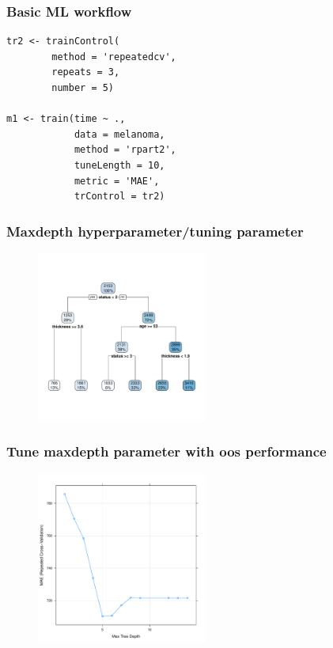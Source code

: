 \documentclass[handout, aspectratio = 169]{beamer}
\begin{document}
\begin{frame}[fragile]
\frametitle{Basic ML workflow}
\begin{Verbatim}
tr2 <- trainControl(
        method = 'repeatedcv',
        repeats = 3,
        number = 5)

m1 <- train(time ~ ., 
            data = melanoma,
            method = 'rpart2',
            tuneLength = 10,
            metric = 'MAE',
            trControl = tr2)

\end{Verbatim}

\end{frame} 




\begin{frame}
\frametitle{Maxdepth hyperparameter/tuning parameter}
\vspace{-4mm}
\begin{figure}
    \includegraphics[width = 0.5\textwidth]{rpart_tree.pdf}
\end{figure} 

\end{frame} 



\begin{frame}
\frametitle{Tune maxdepth parameter with oos performance}
\vspace{-4mm}
\begin{figure}
    \includegraphics[width = 0.5\textwidth]{rpart_perf.pdf}
\end{figure} 

\end{frame} 
\end{document}
